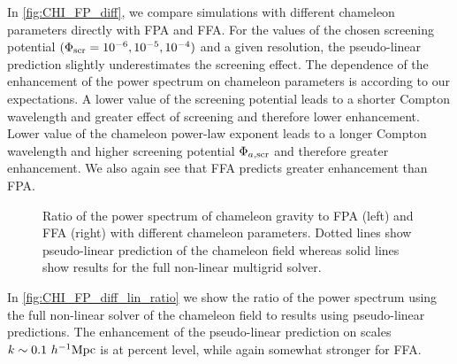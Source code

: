 In \autoref{fig:CHI_FP_diff}, we compare simulations with different chameleon parameters directly with FPA and FFA. For the values of the chosen screening potential $(\Phi_{\text{\scriptsize scr}}=10^{-6}, 10^{-5}, 10^{-4})$ and a given resolution, the pseudo-linear prediction slightly underestimates the screening effect. The dependence of the enhancement of the power spectrum on chameleon parameters is according to our expectations. A lower value of the screening potential leads to a shorter Compton wavelength and greater effect of screening and therefore lower enhancement. Lower value of the chameleon power-law exponent leads to a longer Compton wavelength and higher screening potential $\Phi_{a,\text{\scriptsize scr}}$ and therefore greater enhancement. We also again see that FFA predicts greater enhancement than FPA.

\begin{figure*}
  \centering
	\begin{subfigure}{0.5\textwidth}
	\end{subfigure}
	\begin{subfigure}{0.5\textwidth}
	\end{subfigure}%
	\begin{subfigure}{0.5\textwidth}
	\end{subfigure}
  \caption{Ratio of the power spectrum of chameleon gravity to FPA (left) and FFA (right) with different chameleon parameters. Dotted lines show pseudo-linear prediction of the chameleon field whereas solid lines show results for the full non-linear multigrid solver.}
  \label{fig:CHI_FP_diff}
\end{figure*}

In \autoref{fig:CHI_FP_diff_lin_ratio} we show the ratio of the power spectrum using the full non-linear solver of the chameleon field to results using pseudo-linear predictions. The enhancement of the pseudo-linear prediction on scales $k\sim0.1~h^{-1}\text{Mpc}$ is at percent level, while again somewhat stronger for FFA.

